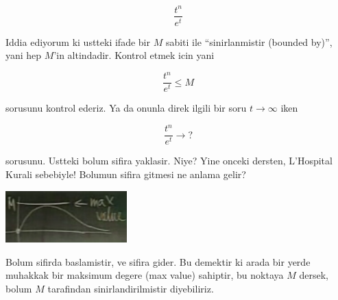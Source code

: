 \documentclass[12pt,fleqn]{article}
\begin{document}
\[ \frac{t^n}{e^t} \]

Iddia ediyorum ki ustteki ifade bir $M$ sabiti ile ``sinirlanmistir
(bounded by)'', yani hep $M$'in altindadir. Kontrol etmek icin yani

\[ \frac{t^n}{e^t} \le  M\]

sorusunu kontrol ederiz. Ya da onunla direk ilgili bir soru  $t \to \infty$ iken

\[ \frac{t^n}{e^t} \to ?\]

sorusunu. Ustteki bolum sifira yaklasir. Niye? Yine onceki dersten,
L'Hospital Kurali sebebiyle! Bolumun sifira gitmesi ne anlama gelir? 

\includegraphics[height=2cm]{20_1.png}

Bolum sifirda baslamistir, ve sifira gider. Bu demektir ki arada bir yerde
muhakkak bir maksimum degere (max value) sahiptir, bu noktaya $M$ dersek,
bolum $M$ tarafindan sinirlandirilmistir diyebiliriz.
\end{document}
